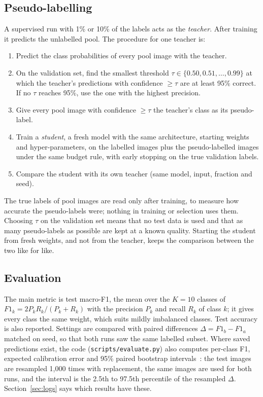 \documentclass[twoside,a4paper,11pt]{article}
\begin{document}
\subsection{Pseudo-labelling}
A supervised run with 1\% or 10\% of the labels acts as the \emph{teacher}. After training it predicts the unlabelled pool. The procedure for one teacher is:
\begin{enumerate}
\item Predict the class probabilities of every pool image with the teacher.
\item On the validation set, find the smallest threshold $\tau\in\{0.50,0.51,\dots,0.99\}$ at which the teacher's predictions with confidence $\geq\tau$ are at least 95\% correct. If no $\tau$ reaches 95\%, use the one with the highest precision.
\item Give every pool image with confidence $\geq\tau$ the teacher's class as its pseudo-label.
\item Train a \emph{student}, a fresh model with the same architecture, starting weights and hyper-parameters, on the labelled images plus the pseudo-labelled images under the same budget rule, with early stopping on the true validation labels.
\item Compare the student with its own teacher (same model, input, fraction and seed).
\end{enumerate}
The true labels of pool images are read only after training, to measure how accurate the pseudo-labels were; nothing in training or selection uses them. Choosing $\tau$ on the validation set means that no test data is used and that as many pseudo-labels as possible are kept at a known quality. Starting the student from fresh weights, and not from the teacher, keeps the comparison between the two like for like.

\subsection{Evaluation}
The main metric is test macro-F1, the mean over the $K=10$ classes of $F1_k = 2P_kR_k/(P_k+R_k)$ with the precision $P_k$ and recall $R_k$ of class $k$; it gives every class the same weight, which suits mildly imbalanced classes. Test accuracy is also reported. Settings are compared with paired differences $\Delta = F1_b - F1_a$ matched on seed, so that both runs saw the same labelled subset. Where saved predictions exist, the code (\texttt{scripts/evaluate.py}) also computes per-class F1, expected calibration error and 95\% paired bootstrap intervals~\cite{efron1979bootstrap}: the test images are resampled 1{,}000 times with replacement, the same images are used for both runs, and the interval is the 2.5th to 97.5th percentile of the resampled $\Delta$. Section~\ref{sec:logs} says which results have these.
\end{document}

